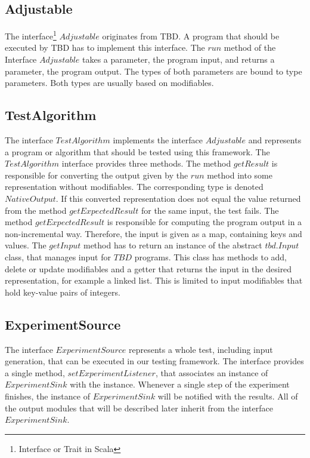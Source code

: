 \subsection{Adjustable}

The interface\footnote{Interface or Trait in Scala} $Adjustable$ originates from TBD. A program that should be executed by TBD has to implement this interface. The $run$ method of the Interface $Adjustable$ takes a parameter, the program input, and returns a parameter, the program output. The types of both parameters are bound to type parameters. Both types are usually based on modifiables. 

\subsection{TestAlgorithm}

The interface $TestAlgorithm$ implements the interface $Adjustable$ and represents a program or algorithm that should be tested using this framework. The $TestAlgorithm$ interface provides three methods. The method $getResult$ is responsible for converting the output given by the $run$ method into some representation without modifiables. The corresponding type is denoted $NativeOutput$. If this converted representation does not equal the value returned from the method $getExpectedResult$ for the same input, the test fails. The method $getExpectedResult$ is responsible for computing the program output in a non-incremental way. Therefore, the input is given as a map, containing keys and values. The $getInput$ method has to return an instance of the abstract $tbd.Input$ class, that manages input for $TBD$ programs. This class has methods to add, delete or update modifiables and a getter that returns the input in the desired representation, for example a linked list. This is limited to input modifiables that hold key-value pairs of integers. 

\subsection{ExperimentSource}

The interface $ExperimentSource$ represents a whole test, including input generation, that can be executed in our testing framework. The interface provides a single method, $setExperimentListener$, that associates an instance of $ExperimentSink$ with the instance. Whenever a single step of the experiment finishes, the instance of $ExperimentSink$ will be notified with the results. All of the output modules that will be described later inherit from the interface $ExperimentSink$.

